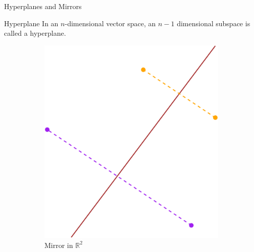 \documentclass[aspectratio=169,xcolor=dvipsnames]{beamer}
\begin{document}
\begin{frame}{Hyperplanes and Mirrors}
    \begin{block}{Hyperplane}
        In an $n$-dimensional vector space, an $n-1$ dimensional subspace is called a \alert{hyperplane}.
    \end{block}

    \begin{figure}
    \centering

    \begin{subfigure}[t]{0.3\textwidth}
        \centering
        \includegraphics[width=0.9\linewidth]{2dMirror.png}
        \caption{Mirror in $\mathbb{R}^2$}
        \label{fig:subim1}
    \end{subfigure}
    \hspace{0.3cm}
    \begin{subfigure}[t]{0.3\textwidth}
        \centering

\end{subfigure}
\end{figure}
\end{frame}
\end{document}
